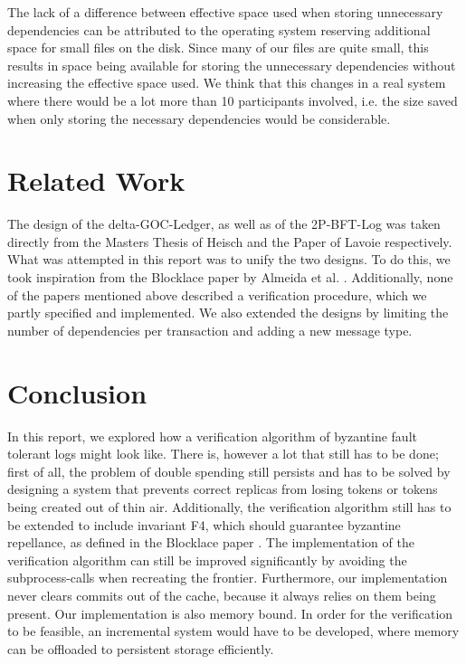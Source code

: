 \documentclass{article}
\begin{document}
The lack of a difference between effective space used when storing unnecessary dependencies can be attributed to the operating system reserving additional space for small files on the disk. Since many of our files are quite small, this results in space being available for storing the unnecessary dependencies without increasing the effective space used. We think that this changes in a real system where there would be a lot more than 10 participants involved, i.e. the size saved when only storing the necessary dependencies would be considerable.

\section{Related Work}
The design of the delta-GOC-Ledger, as well as of the 2P-BFT-Log was taken directly from the Masters Thesis of Heisch \cite{delta-goc-ledger-heisch} and the Paper of Lavoie \cite{2p-bft-log} respectively. What was attempted in this report was to unify the two designs. To do this, we took inspiration from the Blocklace paper by Almeida et al. \cite{blocklace-crdt}. Additionally, none of the papers mentioned above described a verification procedure, which we partly specified and implemented. We also extended the designs by limiting the number of dependencies per transaction and adding a new message type.

\section{Conclusion}
In this report, we explored how a verification algorithm of byzantine fault tolerant logs might look like. There is, however a lot that still has to be done; first of all, the problem of double spending still persists and has to be solved by designing a system that prevents correct replicas from losing tokens or tokens being created out of thin air. Additionally, the verification algorithm still has to be extended to include invariant F4, which should guarantee byzantine repellance, as defined in the Blocklace paper \cite{blocklace-crdt}.
The implementation of the verification algorithm can still be improved significantly by avoiding the subprocess-calls when recreating the frontier.
Furthermore, our implementation never clears commits out of the cache, because it always relies on them being present.
Our implementation is also memory bound. In order for the verification to be feasible, an incremental system would have to be developed, where memory can be offloaded to persistent storage efficiently.

\printbibliography
\end{document}

